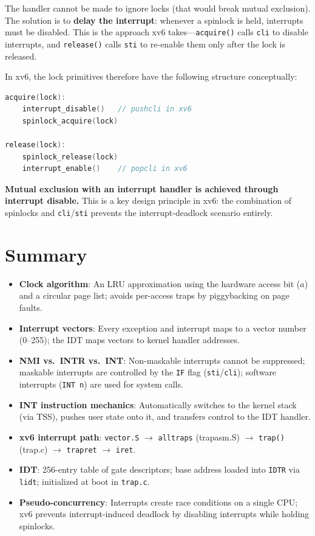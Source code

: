 \documentclass[11pt]{article}
\begin{document}
The handler cannot be made to ignore locks (that would break mutual exclusion). The solution is to \textbf{delay the interrupt}: whenever a spinlock is held, interrupts must be disabled. This is the approach xv6 takes---\texttt{acquire()} calls \texttt{cli} to disable interrupts, and \texttt{release()} calls \texttt{sti} to re-enable them only after the lock is released.

In xv6, the lock primitives therefore have the following structure conceptually:

\begin{lstlisting}[language=C, caption={Interrupt-safe acquire/release in xv6 (conceptual)}]
acquire(lock):
    interrupt_disable()   // pushcli in xv6
    spinlock_acquire(lock)

release(lock):
    spinlock_release(lock)
    interrupt_enable()    // popcli in xv6
\end{lstlisting}

\textbf{Mutual exclusion with an interrupt handler is achieved through interrupt disable.} This is a key design principle in xv6: the combination of spinlocks and \texttt{cli}/\texttt{sti} prevents the interrupt-deadlock scenario entirely.

\section{Summary}

\begin{itemize}
    \item \textbf{Clock algorithm}: An LRU approximation using the hardware access bit ($a$) and a circular page list; avoids per-access traps by piggybacking on page faults.
    \item \textbf{Interrupt vectors}: Every exception and interrupt maps to a vector number (0--255); the IDT maps vectors to kernel handler addresses.
    \item \textbf{NMI vs.\ INTR vs.\ INT}: Non-maskable interrupts cannot be suppressed; maskable interrupts are controlled by the \texttt{IF} flag (\texttt{sti}/\texttt{cli}); software interrupts (\texttt{INT n}) are used for system calls.
    \item \textbf{INT instruction mechanics}: Automatically switches to the kernel stack (via TSS), pushes user state onto it, and transfers control to the IDT handler.
    \item \textbf{xv6 interrupt path}: \texttt{vector.S} $\to$ \texttt{alltraps} (trapasm.S) $\to$ \texttt{trap()} (trap.c) $\to$ \texttt{trapret} $\to$ \texttt{iret}.
    \item \textbf{IDT}: 256-entry table of gate descriptors; base address loaded into \texttt{IDTR} via \texttt{lidt}; initialized at boot in \texttt{trap.c}.
    \item \textbf{Pseudo-concurrency}: Interrupts create race conditions on a single CPU; xv6 prevents interrupt-induced deadlock by disabling interrupts while holding spinlocks.
\end{itemize}
\end{document}
